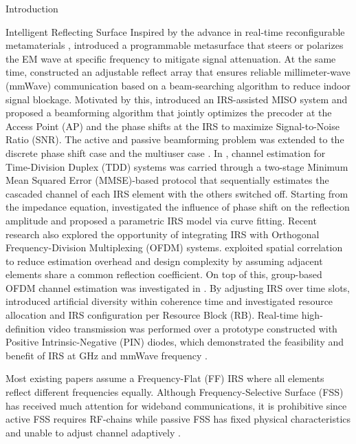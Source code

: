 \documentclass[journal]{IEEEtran}
\begin{document}
\begin{section}{Introduction}
\begin{subsection}{Intelligent Reflecting Surface}
		Inspired by the advance in real-time reconfigurable metamaterials \cite{Cui2014}, \cite{Liaskos2018} introduced a programmable metasurface that steers or polarizes the EM wave at specific frequency to mitigate signal attenuation. At the same time, \cite{Tan2018} constructed an adjustable reflect array that ensures reliable millimeter-wave (mmWave) communication based on a beam-searching algorithm to reduce indoor signal blockage. Motivated by this, \cite{Wu2018,Wu2019} introduced an IRS-assisted MISO system and proposed a beamforming algorithm that jointly optimizes the precoder at the Access Point (AP) and the phase shifts at the IRS to maximize Signal-to-Noise Ratio (SNR). The active and passive beamforming problem was extended to the discrete phase shift case \cite{Wu2019a} and the multiuser case \cite{Guo2019a}. In \cite{Nadeem2019}, channel estimation for Time-Division Duplex (TDD) systems was carried through a two-stage Minimum Mean Squared Error (MMSE)-based protocol that sequentially estimates the cascaded channel of each IRS element with the others switched off. Starting from the impedance equation, \cite{Abeywickrama2019} investigated the influence of phase shift on the reflection amplitude and proposed a parametric IRS model via curve fitting. Recent research also explored the opportunity of integrating IRS with Orthogonal Frequency-Division Multiplexing (OFDM) systems. \cite{Yang2019} exploited spatial correlation to reduce estimation overhead and design complexity by assuming adjacent elements share a common reflection coefficient. On top of this, group-based OFDM channel estimation was investigated in \cite{Zheng2019}. By adjusting IRS over time slots, \cite{Yang2020} introduced artificial diversity within coherence time and investigated resource allocation and IRS configuration per Resource Block (RB). Real-time high-definition video transmission was performed over a prototype constructed with Positive Intrinsic-Negative (PIN) diodes, which demonstrated the feasibility and benefit of IRS at GHz and mmWave frequency \cite{Dai2020}.

		Most existing papers assume a Frequency-Flat (FF) IRS where all elements reflect different frequencies equally. Although Frequency-Selective Surface (FSS) has received much attention for wideband communications, it is prohibitive since active FSS requires RF-chains \cite{Kim2006,Xu2014} while passive FSS has fixed physical characteristics and unable to adjust channel adaptively \cite{Anwar2018}.
	\end{subsection}


\end{section}
\end{document}
